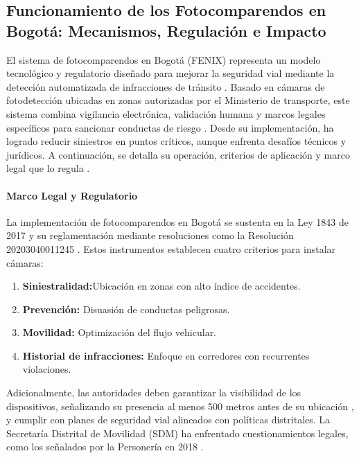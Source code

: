 \documentclass[
    letterpaper, 
    man,   
    spanish,
    12pt,
    donotrepeattitle,
    floatsintext,
    hidelinks %
]{apa7}
\begin{document}
\subsection{Funcionamiento de los Fotocomparendos en Bogotá: Mecanismos, Regulación e Impacto} 
El sistema de fotocomparendos en Bogotá (FENIX) representa un modelo tecnológico y regulatorio diseñado para mejorar la seguridad vial mediante la detección automatizada de infracciones de tránsito \parencite{mintransporte2023}. Basado en cámaras de fotodetección ubicadas en zonas autorizadas por el Ministerio de transporte, este sistema combina vigilancia electrónica, validación humana y marcos legales específicos para sancionar conductas de riesgo \parencite{supertransporte2021}. Desde su implementación, ha logrado reducir siniestros en puntos críticos, aunque enfrenta desafíos técnicos y jurídicos. A continuación, se detalla su operación, criterios de aplicación y marco legal que lo regula \parencite{mintransporte2023}.

\paragraph{Marco Legal y Regulatorio} La implementación de fotocomparendos en Bogotá se sustenta en la Ley 1843 de 2017 \parencite{ley1843} y su reglamentación mediante resoluciones como la Resolución 20203040011245 \parencite{resolucion11245}. Estos instrumentos establecen cuatro criterios para instalar cámaras: 

\begin{enumerate}
    \item \textbf{Siniestralidad:}Ubicación en zonas con alto índice de accidentes. 
    \item \textbf{Prevención:} Disuasión de conductas peligrosas. 
    \item \textbf{Movilidad: } Optimización del flujo vehicular.
        \item \textbf{Historial de infracciones:} Enfoque en corredores con recurrentes violaciones.
\end{enumerate}

Adicionalmente, las autoridades deben garantizar la visibilidad de los dispositivos, señalizando su presencia al menos 500 metros antes de su ubicación \parencite{ley1843}, y cumplir con planes de seguridad vial alineados con políticas distritales. La Secretaría Distrital de Movilidad (SDM) ha enfrentado cuestionamientos legales, como los señalados por la Personería en 2018 \parencite{sdm2023camaras}.
\end{document}

